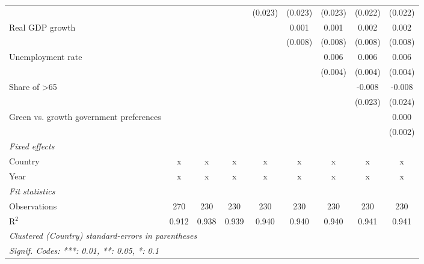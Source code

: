\begin{table}[htbp]
\begin{tabular}{lcccccccc}
                                              &               &               &         & (0.023) & (0.023) & (0.023) & (0.022) & (0.022)\\   
      Real GDP growth                         &               &               &         &         & 0.001   & 0.001   & 0.002   & 0.002\\   
                                              &               &               &         &         & (0.008) & (0.008) & (0.008) & (0.008)\\   
      Unemployment rate                       &               &               &         &         &         & 0.006   & 0.006   & 0.006\\   
                                              &               &               &         &         &         & (0.004) & (0.004) & (0.004)\\   
      Share of >65                            &               &               &         &         &         &         & -0.008  & -0.008\\   
                                              &               &               &         &         &         &         & (0.023) & (0.024)\\   
      Green vs. growth government preferences &               &               &         &         &         &         &         & 0.000\\   
                                              &               &               &         &         &         &         &         & (0.002)\\   
      \emph{Fixed effects}\\
      Country                                 & x             & x             & x       & x       & x       & x       & x       & x\\  
      Year                                    & x             & x             & x       & x       & x       & x       & x       & x\\  
      \midrule \emph{Fit statistics}\\
      Observations                            & 270           & 230           & 230     & 230     & 230     & 230     & 230     & 230\\  
      R$^2$                                   & 0.912         & 0.938         & 0.939   & 0.940   & 0.940   & 0.940   & 0.941   & 0.941\\  
      \midrule
      \multicolumn{9}{l}{\emph{Clustered (Country) standard-errors in parentheses}}\\
      \multicolumn{9}{l}{\emph{Signif. Codes: ***: 0.01, **: 0.05, *: 0.1}}\\
   \end{tabular}
\end{table}


